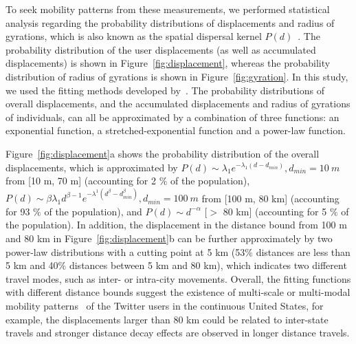 \documentclass[ijgi,article,accept,moreauthors,pdftex,10pt,a4paper]{mdpi}
\theoremstyle{mdpi}
\newcounter{ex}
\newcounter{re}
\theoremstyle{mdpidefinition}
\begin{document}
To seek mobility patterns from these measurements, we performed statistical analysis regarding the probability distributions of displacements and radius of gyrations, which is also known as the spatial dispersal kernel $P(d)$~\cite{brockmann2006scaling}.
The probability distribution of the user displacements (as well as accumulated displacements) is shown in Figure~\ref{fig:displacement}, whereas the probability distribution of radius of gyrations is shown in Figure~\ref{fig:gyration}. 
In this study, we used the fitting methods developed by~\cite{Jurdak2015}.
The probability distributions of overall displacements, and the accumulated displacements and radius of gyrations of individuals, can all be approximated by a combination of three functions: an exponential function, a stretched-exponential function and a power-law function.

Figure~\ref{fig:displacement}a shows the probability distribution of the overall displacements, which is approximated by $P(d) \sim \lambda_{1} e^{-\lambda_{1}(d - d_{min})}, d_{min}=10~m$ from [10 m, 70 m] (accounting for 2 $\%$ of the population), $ P(d) \sim \beta\lambda_{1}d^{\beta-1}e^{-\lambda^{1}(d^\beta-d_{min}^\beta)}, d_{min}=100~m$ from [100 m, 80 km] (accounting for 93 $\%$ of the population), and $P(d) \sim {d}^{-\alpha}$ [$>$ 80 km] (accounting for 5 $\%$ of the population).
In addition, the displacement in the distance bound from 100 m and 80 km in Figure~\ref{fig:displacement}b can be further approximately by two power-law distributions with a cutting point at 5 km (53$\%$ distances are less than 5 km and 40$\%$ distances between 5 km and 80 km), which indicates two different travel modes, such as inter- or intra-city movements.
Overall, the fitting functions with different distance bounds suggest the existence of multi-scale or multi-modal mobility patterns~\cite{Jurdak2015} of the Twitter users in the continuous United States, for example, the displacements larger than 80 km could be related to inter-state travels and stronger distance decay effects are observed in longer distance travels. 
\end{document}
